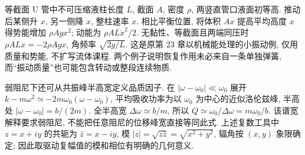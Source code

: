 等截面 U 管中不可压缩液柱长度 $L$, 截面 $A$, 密度 $\rho$, 两竖直管口液面初等高. 推动后某侧升 $x$, 另一侧降 $x$, 整柱速率 $\dot x$. 相比平衡位置, 将体积 $Ax$ 提高平均高度 $x$ 得势能增加 $\rho Agx^2$; 动能为 $\rho AL\dot x^2/2$. 无黏性、等截面且两端同压时 $\rho AL\ddot x=-2\rho Agx$, 角频率 $\sqrt{2g/L}$. 这是原第 23 章以机械能处理的小振动例, 仅用质量和势能, 不扩写流体课程. 两个例子说明恢复作用未必来自一条单独弹簧, 而“振动质量”也可能包含转动或整段连续物质.

弱阻尼下还可从共振峰半高宽定义品质因子. 在 $|\omega-\omega_0|\ll\omega_0$ 展开 $k-m\omega^2\simeq-2m\omega_0(\omega-\omega_0)$, 平均吸收功率为以 $\omega_0$ 为中心的近似洛伦兹峰, 半高处 $|\omega-\omega_0|=b/(2m)$. 全半高宽 $\Delta\omega\simeq b/m$, 所以 $Q\simeq\omega_0/\Delta\omega=m\omega_0/b$. 该谱宽解释要求弱阻尼, 不能把任意阻尼的位移峰宽直接等同此式. 上述复数工具中 $z=x+iy$ 的共轭为 $\bar z=x-iy$, 模 $|z|=\sqrt{z\bar z}=\sqrt{x^2+y^2}$, 辐角按 $(x,y)$ 象限确定; 因此取驱动复幅值的模和相位有明确的几何意义.
